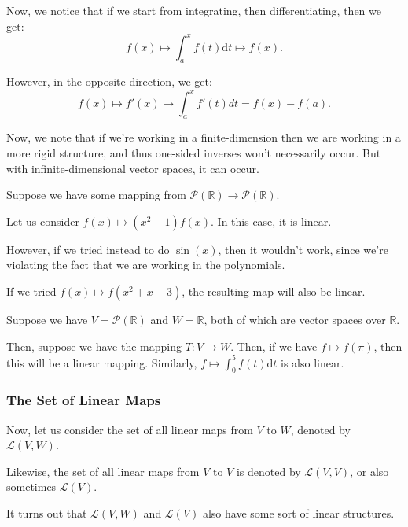 \documentclass[openany]{book}
\newcommand{\RR}{\mathbb{R}}
\begin{document}
\begin{rmk}
		Now, we notice that if we start from integrating, then differentiating, then we get:
	\begin{equation*}
		f(x) \mapsto \int_a^{x} f(t) \mathrm d t \mapsto f(x).
	\end{equation*}

	However, in the opposite direction, we get:
	\begin{equation*}
		f(x) \mapsto f'(x) \mapsto \int_{a}^{x} f'(t)dt = f(x) - f(a).
	\end{equation*}

	Now, we note that if we're working in a finite-dimension then we are working in a more rigid structure, and thus one-sided inverses won't necessarily occur. But with infinite-dimensional vector spaces, it can occur.
\end{rmk}

\begin{example}
	Suppose we have some mapping from $\mathscr{P}(\RR) \rightarrow \mathscr{P}(\RR)$.
	
	Let us consider $f(x) \mapsto (x^{2} - 1)f(x)$. In this case, it is linear.
	
	However, if we tried instead to do $\sin(x)$, then it wouldn't work, since we're violating the fact that we are working in the polynomials.
	
	If we tried $f(x) \mapsto f(x^{2} + x - 3)$, the resulting map will also be linear.
\end{example}
\begin{example}
	Suppose we have $V = \mathscr{P}(\RR)$ and $W = \RR$, both of which are vector spaces over $\RR$.
	
	Then, suppose we have the mapping $T: V \rightarrow W$. Then, if we have $f \mapsto f(\pi)$, then this will be a linear mapping. Similarly, $f \mapsto \int_0^{5} f(t) \mathrm d t$ is also linear.
\end{example}

\subsubsection{The Set of Linear Maps}
Now, let us consider the set of all linear maps from $V$ to $W$, denoted by $\mathcal L (V,W)$.

Likewise, the set of all linear maps from $V$ to $V$ is denoted by $\mathcal L(V,V)$, or also sometimes $\mathcal L (V)$.

It turns out that $\mathcal L(V,W)$ and $\mathcal L(V)$ also have some sort of linear structures.
\end{document}
